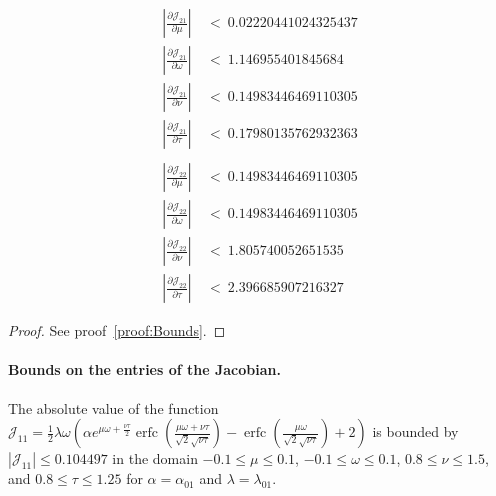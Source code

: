 \documentclass{article}
\renewcommand{\leq}{\leqslant}
\DeclareMathOperator{\erfc}{erfc}
\begin{document}
\begin{lemma}
\begin{align*}
\left| \frac{\partial {\mathcal J}_{21}}{\partial \mu} \right| \ &< \  0.02220441024325437 \\ \nonumber
\left| \frac{\partial {\mathcal J}_{21}}{\partial \omega} \right| \ &< \  1.146955401845684 \\ \nonumber
\left| \frac{\partial {\mathcal J}_{21}}{\partial \nu} \right| \ &< \ 0.14983446469110305 \\ \nonumber
\left| \frac{\partial {\mathcal J}_{21}}{\partial \tau} \right| \ &< \ 0.17980135762932363 \\ \nonumber
\end{align*}
\begin{align*}
\left| \frac{\partial {\mathcal J}_{22}}{\partial \mu} \right| \ &< \ 0.14983446469110305 \\ \nonumber
\left| \frac{\partial {\mathcal J}_{22}}{\partial \omega} \right| \ &< \ 0.14983446469110305 \\ \nonumber
\left| \frac{\partial {\mathcal J}_{22}}{\partial \nu} \right| \ &< \ 1.805740052651535 \\ \nonumber
\left| \frac{\partial {\mathcal J}_{22}}{\partial \tau} \right| \ &< \ 2.396685907216327
\end{align*}
\end{lemma}

\begin{proof}
 See proof~\ref{proof:Bounds}.
\end{proof}


\paragraph{Bounds on the entries of the Jacobian.}

\begin{lemma}[Bound on J11]
\label{lem:J11}
The absolute value of the function \\ 
$\mathcal J_{11} = \frac{1}{2} \lambda  \omega \left( 
	\alpha  e^{\mu \omega+\frac{\nu \tau}{2}} \erfc \left(\frac{\mu \omega + \nu \tau}{\sqrt{2} \sqrt{\nu \tau}}\right) - 
	\erfc\left(\frac{\mu \omega}{\sqrt{2} \sqrt{\nu \tau}}\right)+2\right)$ is bounded by 
$\left|\mathcal J_{11} \right| \leq 0.104497$ in the domain $-0.1 \leq \mu \leq 0.1$, $-0.1 \leq \omega \leq 0.1$, $0.8 \leq \nu \leq 1.5$, 
and $0.8 \leq \tau \leq 1.25$ for $\alpha=\alpha_{\mathrm{01}}$ and $\lambda=\lambda_{\mathrm{01}}$.
\end{lemma}
\end{document}
